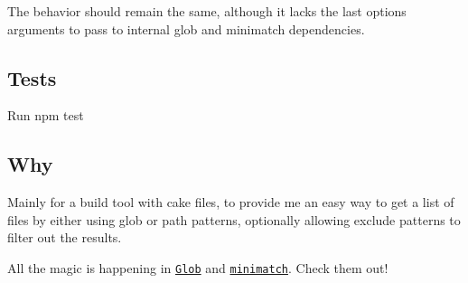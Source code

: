 The behavior should remain the same, although it lacks the last {\ttfamily options} arguments to pass to internal {\ttfamily glob} and {\ttfamily minimatch} dependencies.

\subsection*{Tests}

Run {\ttfamily npm test}

\subsection*{Why}

Mainly for a build tool with cake files, to provide me an easy way to get a list of files by either using glob or path patterns, optionally allowing exclude patterns to filter out the results.

All the magic is happening in \href{https://github.com/isaacs/node-glob}{\tt Glob} and \href{https://github.com/isaacs/minimatch}{\tt minimatch}. Check them out! 